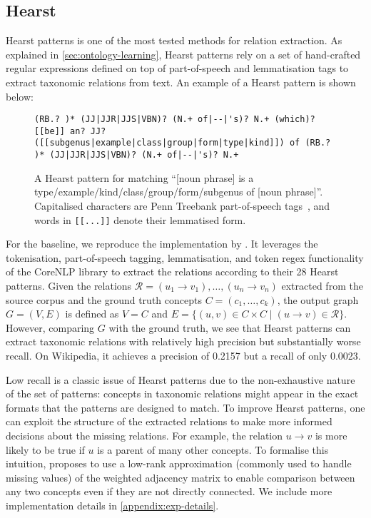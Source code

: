 \subsection{Hearst}
Hearst patterns \cite{hearst1998automated} is one of the most tested methods for relation extraction. As explained in \cref{sec:ontology-learning}, Hearst patterns rely on a set of hand-crafted regular expressions defined on top of part-of-speech and lemmatisation tags to extract taxonomic relations from text. An example of a Hearst pattern is shown below:

\begin{figure}[h]
    \begin{lstlisting}[frame=single]
(RB.? )* (JJ|JJR|JJS|VBN)? (N.+ of|--|'s)? N.+ (which)? [[be]] an? JJ? ([[subgenus|example|class|group|form|type|kind]]) of (RB.? )* (JJ|JJR|JJS|VBN)? (N.+ of|--|'s)? N.+
\end{lstlisting}
    \caption{A Hearst pattern for matching ``[noun phrase] is a type/example/kind/class/group/form/subgenus of [noun phrase]''. Capitalised characters are Penn Treebank part-of-speech tags~\cite{marcus1993building}, and words in \texttt{[[...]]} denote their lemmatised form.}
\end{figure}

For the baseline, we reproduce the implementation by \citet{roller2018hearst}. It leverages the tokenisation, part-of-speech tagging, lemmatisation, and token regex functionality of the CoreNLP library \cite{manning2014stanford} to extract the relations according to their 28 Hearst patterns. Given the relations $\mathcal{R} = (u_1 \to v_1), \dots, (u_n \to v_n)$ extracted from the source corpus and the ground truth concepts $C = (c_1, \dots, c_k)$, the output graph $G = (V, E)$ is defined as $V = C$ and $E = \{(u, v) \in C \times C \mid (u \to v) \in \mathcal{R}\}$. However, comparing $G$ with the ground truth, we see that Hearst patterns can extract taxonomic relations with relatively high precision but substantially worse recall. On Wikipedia, it achieves a precision of 0.2157 but a recall of only 0.0023.

Low recall is a classic issue of Hearst patterns due to the non-exhaustive nature of the set of patterns: concepts in taxonomic relations might appear in the exact formats that the patterns are designed to match. To improve Hearst patterns, one can exploit the structure of the extracted relations to make more informed decisions about the missing relations. For example, the relation $u \to v$ is more likely to be true if $u$ is a parent of many other concepts. To formalise this intuition, \citet{roller2018hearst} proposes to use a low-rank approximation \cite{schmidt1907theorie} (commonly used to handle missing values) of the weighted adjacency matrix to enable comparison between any two concepts even if they are not directly connected. We include more implementation details in \cref{appendix:exp-details}.

